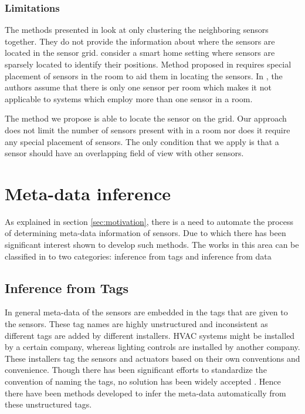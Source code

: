 \subsubsection*{Limitations}
The methods presented in \cite{Hong:2013:TAS:2528282.2528302,doi:10.1061/9780784413616.226,Koc:2014:CLC:2674061.2674075,muller2014automated} look at only clustering the neighboring sensors together. They do not provide the information about where the sensors are located in the sensor grid. \cite{ellis2012creating,Lu:2014:SBS:2648771.2629441,muller2014automated} consider a smart home setting where sensors are sparsely located to identify their positions. Method proposed in \cite{Lu:2014:SBS:2648771.2629441} requires special placement of sensors in the room to aid them in locating the sensors. In \cite{ellis2012creating}, the authors assume that there is only one sensor per room which makes it not applicable to systems which employ more than one sensor in a room. 

The method we propose is able to locate the sensor on the grid. Our approach does not limit the number of sensors present with in a room nor does it require any special placement of sensors. The only condition that we apply is that a sensor should have an overlapping field of view with other sensors.


\section{Meta-data inference}

As explained in section \ref{sec:motivation}, there is a need to automate the process of determining meta-data information of sensors. Due to which there has been significant interest shown to develop such methods. The works in this area can be classified in to two categories: inference from tags and inference from data
\subsection{Inference from Tags}
In general meta-data of the sensors are embedded in the tags that are given to the sensors. These tag names are highly unstructured and inconsistent as different tags are added by different installers. HVAC systems might be installed by a certain company, whereas lighting controls are installed by another company. These installers tag the sensors and actuators based on their own conventions and convenience. Though there has been significant efforts to standardize the convention of naming the tags, no solution has been widely accepted \cite{gao2015data}. Hence there have been methods developed to infer the meta-data automatically from these unstructured tags.

